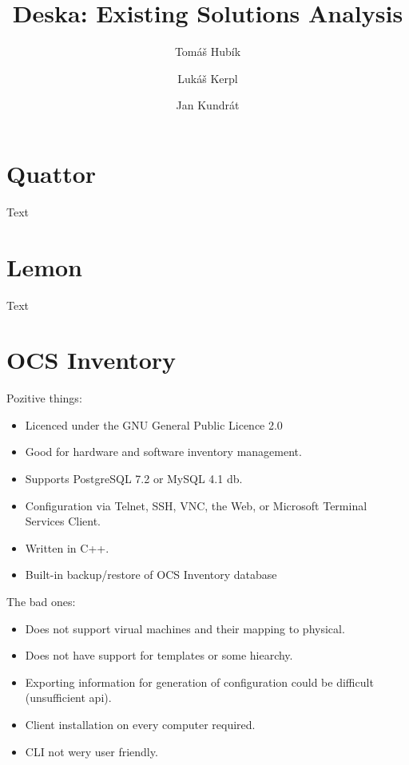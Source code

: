 \documentclass[12pt]{article}
\author{Tomáš Hubík \and Lukáš Kerpl \and Jan Kundrát}
\title{Deska: Existing Solutions Analysis}
\begin{document}
\maketitle

\newpage

\tableofcontents

\newpage




\section{Quattor}
Text



\section{Lemon}
Text



\section{OCS Inventory}
Pozitive things:
\begin{itemize}
\item Licenced under the GNU General Public Licence 2.0
\item Good for hardware and software inventory management.
\item Supports PostgreSQL 7.2 or MySQL 4.1 db.
\item Configuration via Telnet, SSH, VNC, the Web, or Microsoft Terminal Services Client.
\item Written in C++.
\item Built-in backup/restore of OCS Inventory database
\end{itemize}


The bad ones:
\begin{itemize}
\item Does not support virual machines and their mapping to physical.
\item Does not have support for templates or some hiearchy.
\item Exporting information for generation of configuration could be difficult (unsufficient api). %
\item Client installation on every computer required.
\item CLI not wery user friendly.
\end{itemize}
\end{document}
